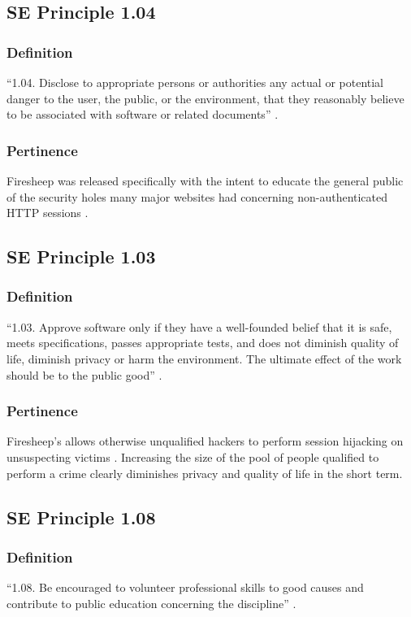 \documentclass[12pt,twocolumn]{article}
\begin{document}
\subsection{SE Principle 1.04}
\subsubsection{Definition}
``1.04. Disclose to appropriate persons or authorities any actual or potential danger to the user, the public, or the environment, that they reasonably believe to be associated with software or related documents'' \cite{se-code}.
\subsubsection{Pertinence}
Firesheep was released specifically with the intent to educate the general public of the security holes many major websites had concerning non-authenticated HTTP sessions \cite{eric-butler}.

\subsection{SE Principle 1.03}
\subsubsection{Definition}
``1.03. Approve software only if they have a well-founded belief that it is safe, meets specifications, passes appropriate tests, and does not diminish quality of life, diminish privacy or harm the environment. The ultimate effect of the work should be to the public good'' \cite{se-code}.
\subsubsection{Pertinence}
Firesheep's allows otherwise unqualified hackers to perform session hijacking on unsuspecting victims \cite{eric-butler}. Increasing the size of the pool of people qualified to perform a crime clearly diminishes privacy and quality of life in the short term.

\subsection{SE Principle 1.08}
\subsubsection{Definition}
``1.08. Be encouraged to volunteer professional skills to good causes and contribute to public education concerning the discipline'' \cite{se-code}.
\end{document}
